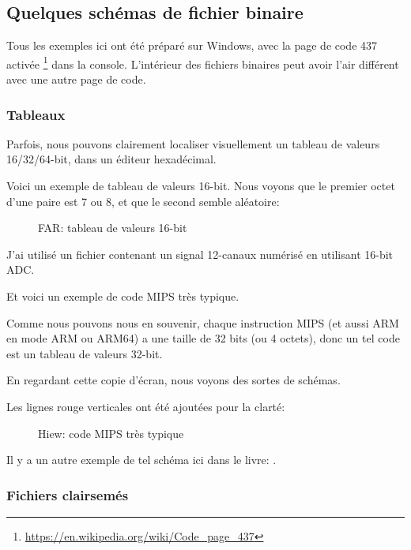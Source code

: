 
\subsection{Quelques schémas de fichier binaire}

Tous les exemples ici ont été préparé sur Windows, avec la page de code 437 activée%
\footnote{\url{https://en.wikipedia.org/wiki/Code_page_437}} dans la console.
L'intérieur des fichiers binaires peut avoir l'air différent avec une autre page
de code.

\clearpage
\subsubsection{Tableaux}

Parfois, nous pouvons clairement localiser visuellement un tableau de valeurs 16/32/64-bit,
dans un éditeur hexadécimal.

Voici un exemple de tableau de valeurs 16-bit.
Nous voyons que le premier octet d'une paire est 7 ou 8, et que le second semble
aléatoire:

\begin{figure}[H]
\centering
{}
\caption{FAR: tableau de valeurs 16-bit}
\end{figure}

J'ai utilisé un fichier contenant un signal 12-canaux numérisé en utilisant 16-bit \ac{ADC}.

\clearpage
{}
\par Et voici un exemple de code MIPS très typique.

Comme nous pouvons nous en souvenir, chaque instruction MIPS (et aussi ARM en mode
ARM ou ARM64) a une taille de 32 bits (ou 4 octets), donc un tel code est un tableau
de valeurs 32-bit.

En regardant cette copie d'écran, nous voyons des sortes de schémas.

Les lignes rouge verticales ont été ajoutées pour la clarté:

\begin{figure}[H]
\centering
{}
\caption{Hiew: code MIPS très typique}
\end{figure}

Il y a un autre exemple de tel schéma ici dans le livre:
.

\clearpage
\subsubsection{Fichiers clairsemés}

